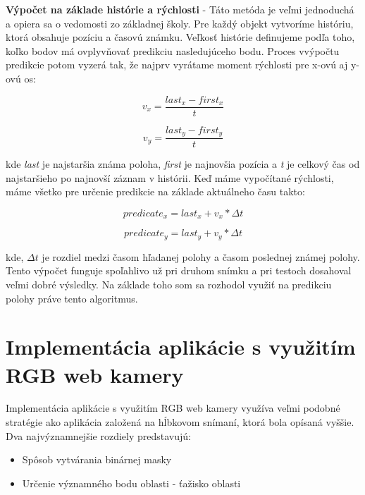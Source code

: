 \textbf{Výpočet na základe histórie a rýchlosti} - Táto metóda je veľmi jednoduchá a opiera sa o vedomosti zo základnej školy. Pre každý objekt vytvoríme históriu, ktorá obsahuje pozíciu a časovú známku. Veľkosť histórie definujeme podľa toho, koľko bodov má ovplyvňovať predikciu nasledujúceho bodu. Proces vvýpočtu predikcie potom vyzerá tak, že najprv vyrátame moment rýchlosti pre x-ovú aj y-ovú os: 

\begin{figure}[H]
  \centering
  \begin{minipage}[b]{0.45\textwidth}
    $$v_x = \frac{last_x - first_x} {t} $$ 
  \end{minipage}
  \hfill
  \begin{minipage}[b]{0.4\textwidth}
    $$v_y = \frac{last_y - first_y} {t} $$ 
  \end{minipage}
\end{figure}
kde \textit{last} je najstaršia známa poloha, \textit{first} je najnovšia pozícia a \textit{t} je celkový čas od najstaršieho po najnovší záznam v histórii. Keď máme vypočítané rýchlosti, máme všetko pre určenie predikcie na základe aktuálneho času takto: 

\begin{figure}[H]
  \centering
  \begin{minipage}[b]{0.45\textwidth}
    $$predicate_x = last_x + v_x * \Delta t $$ 
  \end{minipage}
  \hfill
  \begin{minipage}[b]{0.4\textwidth}
     $$predicate_y = last_y + v_y * \Delta t $$ 
  \end{minipage}
\end{figure}
kde, $\Delta t$ je rozdiel medzi časom hľadanej polohy a časom poslednej známej polohy. Tento výpočet funguje spoľahlivo už pri druhom snímku a pri testoch dosahoval veľmi dobré výsledky. Na základe toho som sa rozhodol využiť na predikciu polohy práve tento algoritmus. 

\section{Implementácia aplikácie s využitím RGB web kamery}
Implementácia aplikácie s využitím RGB web kamery využíva veľmi podobné stratégie ako aplikácia založená na hĺbkovom snímaní, ktorá bola opísaná vyššie. Dva najvýznamnejšie rozdiely predstavujú:
\begin{itemize}
\item Spôsob vytvárania binárnej masky
\item Určenie významného bodu oblasti - ťažisko oblasti
\end{itemize}

